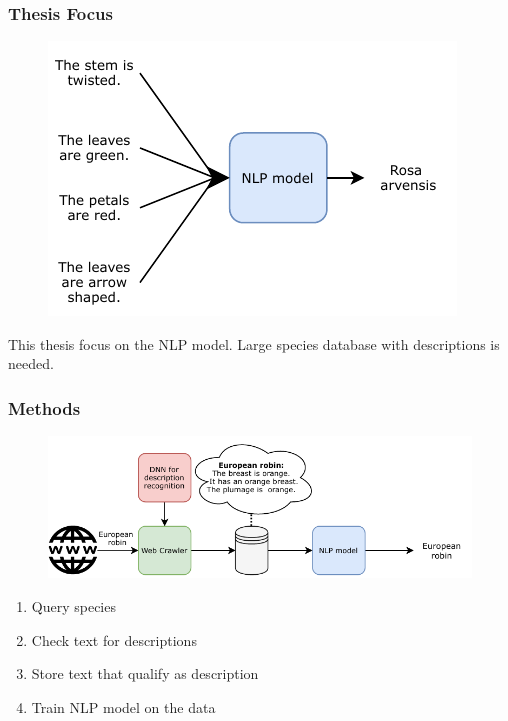 \documentclass{beamer}
\begin{document}
\begin{frame}
\frametitle{Thesis Focus}
\begin{figure} [htbp]
    \centering
    \includegraphics[width=.7\textwidth]{figures/architecture_part.pdf}
\end{figure}
This thesis focus on the NLP model.
Large species database with descriptions is needed.
\end{frame}


\begin{frame}
\frametitle{Methods}
\begin{figure} [htbp]
    \centering
    \includegraphics[width=\textwidth]{figures/workflow.pdf}
\end{figure}
\begin{enumerate}
    \item Query species
    \item Check text for descriptions 
    \item Store text that qualify as description
    \item Train NLP model on the data
\end{enumerate}
\end{frame}
\end{document}
